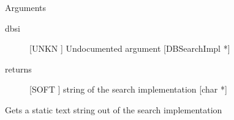 Arguments
\begin{description}
\item[dbsi] [UNKN ] Undocumented argument [DBSearchImpl *]
\item[returns] [SOFT ] string of the search implementation [char *]
\end{description}
Gets a static text string out of the
search implementation 


